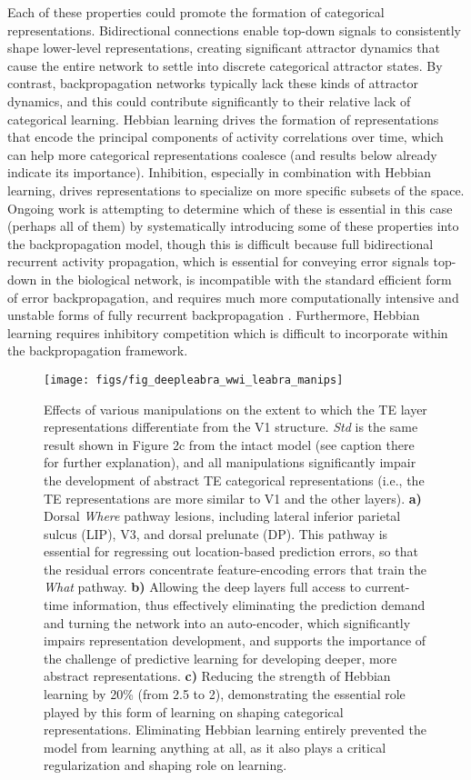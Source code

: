 \documentclass[12pt,twoside]{article}
\newif\myifpdf
\begin{document}
Each of these properties could promote the formation of categorical representations. Bidirectional connections enable top-down signals to consistently shape lower-level representations, creating significant attractor dynamics that cause the entire network to settle into discrete categorical attractor states. By contrast, backpropagation networks typically lack these kinds of attractor dynamics, and this could contribute significantly to their relative lack of categorical learning.  Hebbian learning drives the formation of representations that encode the principal components of activity correlations over time, which can help more categorical representations coalesce (and results below already indicate its importance).  Inhibition, especially in combination with Hebbian learning, drives representations to specialize on more specific subsets of the space.  Ongoing work is attempting to determine which of these is essential in this case (perhaps all of them) by systematically introducing some of these properties into the backpropagation model, though this is difficult because full bidirectional recurrent activity propagation, which is essential for conveying error signals top-down in the biological network, is incompatible with the standard efficient form of error backpropagation, and requires much more computationally intensive and unstable forms of fully recurrent backpropagation \cite{WilliamsZipser92,Pineda87}.  Furthermore, Hebbian learning requires inhibitory competition which is difficult to incorporate within the backpropagation framework.

\begin{figure}
  \centering\texttt{[image: figs/fig\_deepleabra\_wwi\_leabra\_manips]}
  \caption{\small Effects of various manipulations on the extent to which the TE layer representations differentiate from the V1 structure.  {\em Std} is the same result shown in Figure 2c from the intact model (see caption there for further explanation), and all manipulations significantly impair the development of abstract TE categorical representations (i.e., the TE representations are more similar to V1 and the other layers).  {\bf a)} Dorsal {\em Where} pathway lesions, including lateral inferior parietal sulcus (LIP), V3, and dorsal prelunate (DP).  This pathway is essential for regressing out location-based prediction errors, so that the residual errors concentrate feature-encoding errors that train the {\em What} pathway.  {\bf b)} Allowing the deep layers full access to current-time information, thus effectively eliminating the prediction demand and turning the network into an auto-encoder, which significantly impairs representation development, and supports the importance of the challenge of predictive learning for developing deeper, more abstract representations.  {\bf c)} Reducing the strength of Hebbian learning by 20\% (from 2.5 to 2), demonstrating the essential role played by this form of learning on shaping categorical representations.  Eliminating Hebbian learning entirely prevented the model from learning anything at all, as it also plays a critical regularization and shaping role on learning.}
  \label{fig.manips}
\end{figure}
\end{document}
